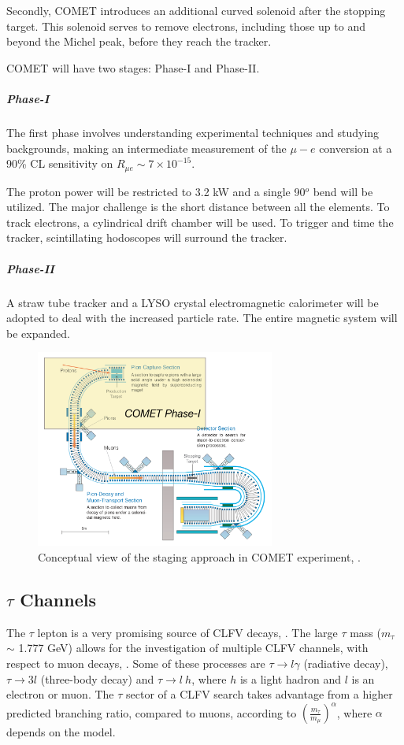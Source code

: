 Secondly, COMET introduces an 
additional curved solenoid after 
the stopping target. This solenoid serves 
to remove electrons, including those 
up to and beyond the Michel peak, 
before they reach the tracker.

COMET will have two stages: Phase-I and Phase-II.
\subparagraph*{Phase-I} The first phase 
involves understanding experimental 
techniques and studying backgrounds, 
making an intermediate
measurement of the $\mu-e$ conversion at a 90\% CL 
sensitivity on $R_{\mu e} \sim 7\times 10^{-15}$.

The proton power will be restricted to 
3.2 kW and a single 90$^o$ bend will be utilized.
The major challenge is the short distance 
between all the elements. 
To track electrons, a cylindrical drift 
chamber will be used. To trigger and time the tracker, 
scintillating hodoscopes will surround the tracker. 
\subparagraph*{Phase-II} A straw tube 
tracker and a LYSO crystal electromagnetic 
calorimeter will be adopted to deal 
with the increased particle rate. 
The entire magnetic system will be expanded.

\begin{figure}[!h]
\centering
\includegraphics[width =0.7\textwidth]{figures/png/Screenshot_20240307_152133.png}
\caption[COMET experiment.]{Conceptual view of the staging approach in COMET experiment, \cite{Abramishvili_2020}.}
\label{fig:comet}
\end{figure}

\subsection{$\tau$ Channels}
The $\tau$ lepton is a very promising 
source of CLFV decays, \cite{universe8060299}. 
The large $\tau$ mass ($m_\tau$ $\sim$ 1.777 GeV) 
allows for the investigation of multiple CLFV
channels, with respect to muon decays, 
\cite{clfv_signorelli}. 
Some of these processes are 
$\tau \rightarrow l \gamma$ (radiative decay), $\tau \rightarrow 3l$ (three-body decay) 
and $\tau\rightarrow l \ h$, 
where $h$ is a light hadron and $l$ 
is an electron or muon. The $\tau$ 
sector of a CLFV search takes advantage 
from a higher predicted branching ratio, 
compared to muons, 
according to $(\frac{m_\tau}{m_\mu})^\alpha$, 
where $\alpha$ depends on the model. 

